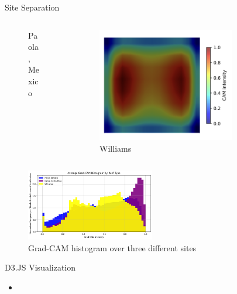 \begin{frame}{Site Separation}
\begin{columns}
\begin{column}{0.32\textwidth}
\begin{figure}
                \caption{Paola, Mexico}
            \end{figure}
        \end{column}
        \begin{column}{0.32\textwidth}
            \begin{figure}
                \centering
                \includegraphics[height=0.5\textheight,width=0.75\textwidth,keepaspectratio]{images/WilliamsNonDegraded.png}
                \caption{Williams}
            \end{figure}
        \end{column}
    \end{columns}
    \begin{figure}
        \centering
        \includegraphics[height=0.3\textheight,width=0.5\textwidth,keepaspectratio]{images/gradcamsitesep.jpg}
        \caption{Grad-CAM histogram over three different sites}
    \end{figure}
\end{frame}

\begin{frame}{D3.JS Visualization}
    \begin{itemize}
        \item 
    \end{itemize}
\end{frame}